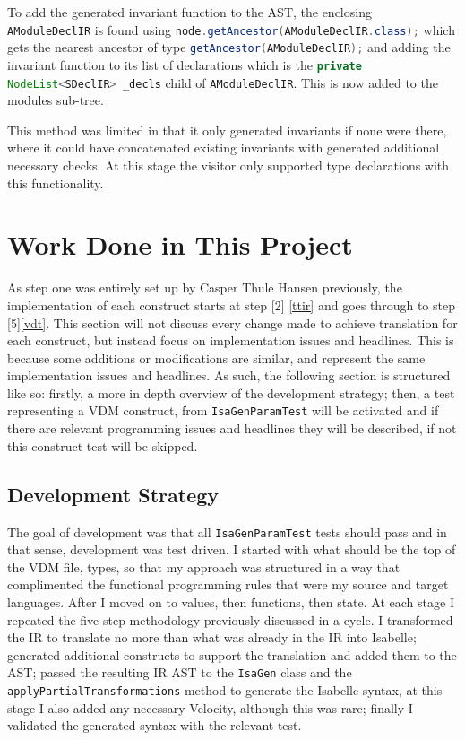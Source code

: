 	To add the generated invariant function to the AST, the enclosing \lstinline[language=Java]{AModuleDeclIR} is found using \lstinline[language=Java]{node.getAncestor(AModuleDeclIR.class);} which gets the nearest ancestor of type \lstinline[language=Java]{getAncestor(AModuleDeclIR);} and adding the invariant function to its list of declarations which is the \lstinline[language=Java]{private NodeList<SDeclIR> _decls} child of \lstinline[language=Java]{AModuleDeclIR}. This is now added to the modules sub-tree. 

	This method was limited in that it only generated invariants if none were there, where it could have concatenated existing invariants with generated additional necessary checks. At this stage the visitor only supported type declarations with this functionality.

	\section{Work Done in This Project}
	As step one was entirely set up by Casper Thule Hansen previously, the implementation of each construct starts at step [2] \ref{ttir} and goes through to step [5]\ref{vdt}. This section will not discuss every change made to achieve translation for each construct, but instead focus on implementation issues and headlines. This is because some additions or modifications are similar, and represent the same implementation issues and headlines. As such, the following section is structured like so: firstly, a more in depth overview of the development strategy; then, a test representing a VDM construct, from \lstinline[language=Java]{IsaGenParamTest} will be activated and if there are relevant programming issues and headlines they will be described, if not this construct test will be skipped.

	\subsection{Development Strategy}
	The goal of development was that all \lstinline[language=Java]{IsaGenParamTest} tests should pass and in that sense, development was test driven. I started with what should be the top of the VDM file, types, so that my approach was structured in a way that complimented the functional programming rules that were my source and target languages. After I moved on to values, then functions, then state. At each stage I repeated the five step methodology previously discussed in a cycle. I transformed the IR to translate no more than what was already in the IR into Isabelle; generated additional constructs to support the translation and added them to the AST; passed the resulting IR AST to the \lstinline[language=Java]{IsaGen} class and the \lstinline[language=Java]{applyPartialTransformations} method to generate the Isabelle syntax, at this stage I also added any necessary Velocity, although this was rare; finally I validated the generated syntax with the relevant test.

